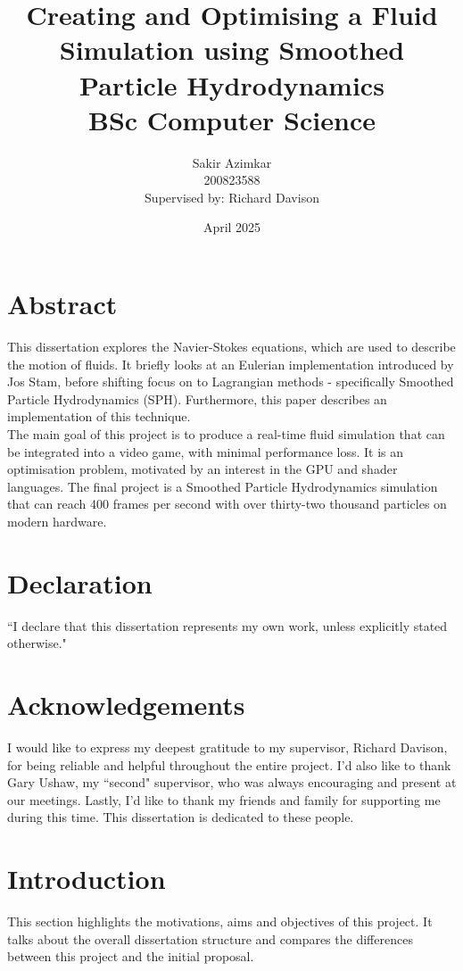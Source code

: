 \documentclass[12pt]{article}
\title
{
    {\Huge Creating and Optimising a Fluid Simulation using Smoothed Particle Hydrodynamics} \\
    \vspace*{1cm}
    {\LARGE BSc Computer Science}
}
\author
{
    \vspace*{0.1cm}\huge Sakir Azimkar \\
    \vspace*{1cm}\huge 200823588 \\
    \large Supervised by: Richard Davison
}
\date{April 2025}
\begin{document}
    \maketitle
    \newpage

    \section*{Abstract}
    This dissertation explores the Navier-Stokes equations, which are used to describe the motion of fluids. It briefly looks at an Eulerian implementation introduced by Jos Stam\cite{stam}, before shifting focus on to Lagrangian methods - specifically Smoothed Particle Hydrodynamics (SPH). Furthermore, this paper describes an implementation of this technique. \\ The main goal of this project is to produce a real-time fluid simulation that can be integrated into a video game, with minimal performance loss. It is an optimisation problem, motivated by an interest in the GPU and shader languages. The final project is a Smoothed Particle Hydrodynamics simulation that can reach 400 frames per second with over thirty-two thousand particles on modern hardware.
    
    \newpage

    \section*{Declaration} ``I declare that this dissertation represents my own work, unless explicitly stated otherwise."

    \newpage

    \section*{Acknowledgements}
    I would like to express my deepest gratitude to my supervisor, Richard Davison, for being reliable and helpful throughout the entire project. I'd also like to thank Gary Ushaw, my ``second" supervisor, who was always encouraging and present at our meetings. Lastly, I'd like to thank my friends and family for supporting me during this time. This dissertation is dedicated to these people.
    
    \newpage
    \tableofcontents
    \newpage
    \listoffigures
    \newpage

    \section{Introduction}
    This section highlights the motivations, aims and objectives of this project. It talks about the overall dissertation structure and compares the differences between this project and the initial proposal.
    
\end{document}
